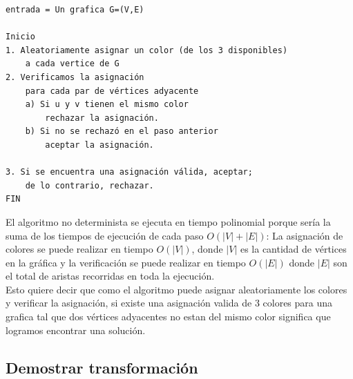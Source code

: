 \begin{verbatim}
entrada = Un grafica G=(V,E)

Inicio
1. Aleatoriamente asignar un color (de los 3 disponibles) 
    a cada vertice de G
2. Verificamos la asignación
    para cada par de vértices adyacente
    a) Si u y v tienen el mismo color
        rechazar la asignación.
    b) Si no se rechazó en el paso anterior
        aceptar la asignación.

3. Si se encuentra una asignación válida, aceptar; 
    de lo contrario, rechazar.
FIN
\end{verbatim}

El algoritmo no determinista se ejecuta en tiempo polinomial porque sería la suma de los 
tiempos de ejecución de cada paso $O(|V| + |E|)$: La asignación de colores se puede 
realizar en tiempo $O(|V|)$, donde $|V|$ es la cantidad de vértices en la gráfica y la
verificación se puede realizar en tiempo $O(|E|)$ donde $|E|$ son el total de aristas
recorridas en toda la ejecución.\\ 

Esto quiere decir que como el algoritmo puede asignar aleatoriamente los colores y verificar 
la asignación, si existe una asignación valida de 3 colores para una grafica tal que dos 
vértices adyacentes no estan del mismo color significa que logramos encontrar una solución. 



\subsection{\textcolor{Contraste4}{Demostrar transformación}}

